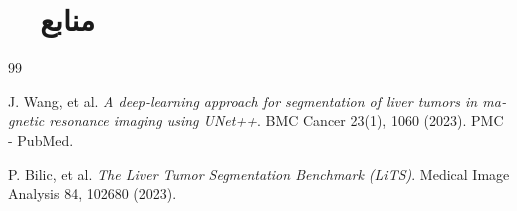 \section[منابع]{\faBook\ \ منابع}

\begin{stepbox}
\begin{latin} %
\renewcommand{\refname}{}

\begin{thebibliography}{99}

J. Wang, et al. 
\textit{A deep-learning approach for segmentation of liver tumors in magnetic resonance imaging using UNet++}. 
BMC Cancer 23(1), 1060 (2023). PMC - PubMed.

P. Bilic, et al. 
\textit{The Liver Tumor Segmentation Benchmark (LiTS)}. 
Medical Image Analysis 84, 102680 (2023).

\end{thebibliography}

\end{latin}
\end{stepbox}
